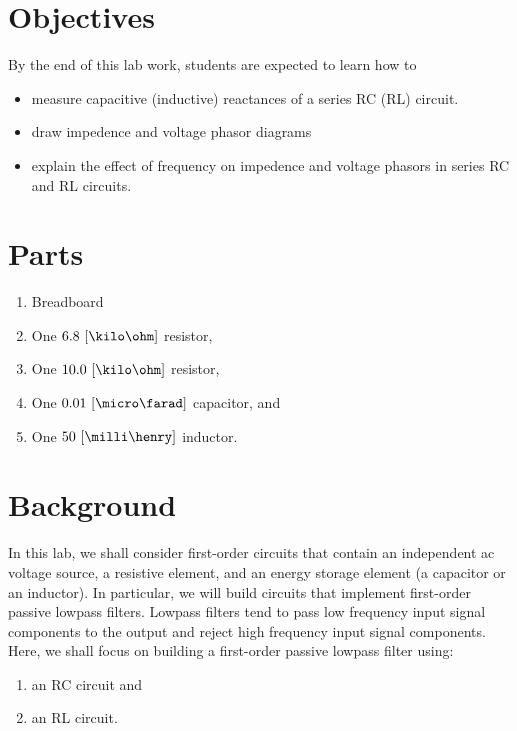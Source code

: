 \section{Objectives}
By the end of this lab work, students are expected to learn how to 

\begin{itemize}
\item measure capacitive (inductive) reactances of a series RC (RL) circuit.
  
\item draw impedence and voltage phasor diagrams 
  
\item explain the effect of frequency on impedence and voltage phasors in series RC and RL circuits. 
  

\end{itemize}

\section{Parts}
\label{sec:partsEx6}

\begin{enumerate}
\item Breadboard    
\item One $6.8~[\kilo\ohm]$ resistor,
\item One $10.0~[\kilo\ohm]$ resistor,
  
\item One $0.01~[\micro\farad]$ capacitor, and
\item One $50~[\milli\henry]$ inductor.
  
\end{enumerate}

\section{Background}
\label{sec:background}

In this lab, we shall consider first-order circuits that contain an independent ac voltage source, a resistive element, and an energy storage element (a capacitor or an inductor). In particular, we will build circuits that implement  first-order passive lowpass filters. Lowpass filters tend to pass low frequency input signal  components to the output and reject high frequency input signal components.  Here, we shall focus on building a first-order passive lowpass filter using:
\begin{enumerate}
\item an RC circuit and
  
\item an RL circuit. 
\end{enumerate}

